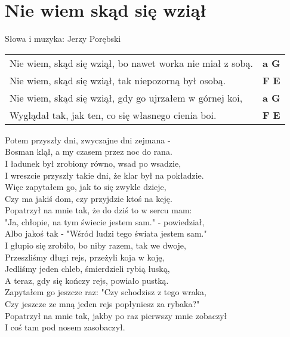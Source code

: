 \section{Nie wiem skąd się wziął}

Słowa i muzyka: Jerzy Porębski

\vspace{2em}
\begin{tabular}{@{}p{10cm}@{}l@{}}
Nie wiem, skąd się wziął, bo nawet worka nie miał z sobą. & \bfseries a G\\
Nie wiem, skąd się wziął, tak niepozorną był osobą. & \bfseries F E\\
Nie wiem, skąd się wziął, gdy go ujrzałem w górnej koi, & \bfseries a G\\
Wyglądał tak, jak ten, co się własnego cienia boi. & \bfseries F E\\
\end{tabular}

\vspace{1em}
Potem przyszły dni, zwyczajne dni zejmana - \\
Bosman klął, a my czasem przez noc do rana. \\
I ładunek był zrobiony równo, wsad po wsadzie, \\
I wreszcie przyszły takie dni, że klar był na pokładzie. \\

Więc zapytałem go, jak to się zwykle dzieje, \\
Czy ma jakiś dom, czy przyjdzie ktoś na keję. \\
Popatrzył na mnie tak, że do dziś to w sercu mam: \\
"Ja, chłopie, na tym świecie jestem sam." - powiedział, \\
Albo jakoś tak - "Wśród ludzi tego świata jestem sam." \\

I głupio się zrobiło, bo niby razem, tak we dwoje, \\
Przeszliśmy długi rejs, przeżyli koja w koję, \\
Jedliśmy jeden chleb, śmierdzieli rybią łuską, \\
A teraz, gdy się kończy rejs, powiało pustką. \\

Zapytałem go jeszcze raz: "Czy schodzisz z tego wraka, \\
Czy jeszcze ze mną jeden rejs popłyniesz za rybaka?" \\
Popatrzył na mnie tak, jakby po raz pierwszy mnie zobaczył \\
I coś tam pod nosem zasobaczył. \\

